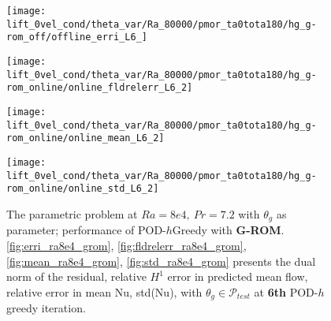 \begin{figure}[h!]
    \begin{minipage}[b]{.25\linewidth}
        \centering \texttt{[image: lift\_0vel\_cond/theta\_var/Ra\_80000/pmor\_ta0tota180/hg\_g-rom\_off/offline\_erri\_L6\_]}
        \label{fig:erri_ra8e4_grom}
    \end{minipage}%
    \begin{minipage}[b]{.25\linewidth}
        \centering \texttt{[image: lift\_0vel\_cond/theta\_var/Ra\_80000/pmor\_ta0tota180/hg\_g-rom\_online/online\_fldrelerr\_L6\_2]}
        \label{fig:fldrelerr_ra8e4_grom}
    \end{minipage}
    \begin{minipage}[b]{.25\linewidth}
        \centering \texttt{[image: lift\_0vel\_cond/theta\_var/Ra\_80000/pmor\_ta0tota180/hg\_g-rom\_online/online\_mean\_L6\_2]}
        \label{fig:mean_ra8e4_grom}
    \end{minipage}%
    \begin{minipage}[b]{.25\linewidth}
        \centering \texttt{[image: lift\_0vel\_cond/theta\_var/Ra\_80000/pmor\_ta0tota180/hg\_g-rom\_online/online\_std\_L6\_2]}
        \label{fig:std_ra8e4_grom}
    \end{minipage} 
    \caption{The parametric problem at $Ra=8e4,~Pr=7.2$ with $\theta_g$ as
    parameter; performance of POD-$h$Greedy with \textbf{G-ROM}.  \ref{fig:erri_ra8e4_grom},
    \ref{fig:fldrelerr_ra8e4_grom}, \ref{fig:mean_ra8e4_grom}, \ref{fig:std_ra8e4_grom}
    presents the dual norm of the residual, relative $H^1$ error in predicted
    mean flow, relative error in mean Nu, std(Nu), with $\theta_g \in
    \mathcal{P}_{test}$ at \textbf{6th} POD-$h$greedy iteration.}
    \label{fig:online_ra8e4_grom} 
\end{figure}

